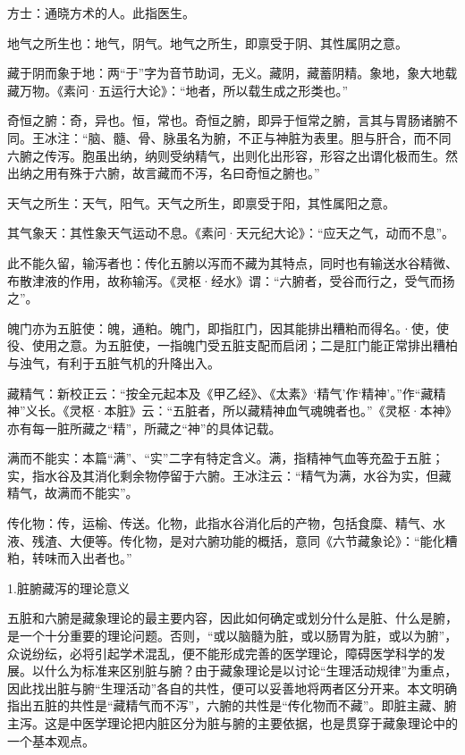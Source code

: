 \documentclass[12pt]{ctexbook}
\begin{document}

\begin{jiaozhu}
  \item 方士：通晓方术的人。此指医生。
  \item 地气之所生也：地气，阴气。地气之所生，即禀受于阴、其性属阴之意。
  \item 藏于阴而象于地：两“于”字为音节助词，无义。藏阴，藏蓄阴精。象地，象大地载藏万物。《素问·五运行大论》：“地者，所以载生成之形类也。”
  \item 奇恒之腑：奇，异也。恒，常也。奇恒之腑，即异于恒常之腑，言其与胃肠诸腑不同。王冰注：“脑、髓、骨、脉虽名为腑，不正与神脏为表里。胆与肝合，而不同六腑之传泻。胞虽出纳，纳则受纳精气，出则化出形容，形容之出谓化极而生。然出纳之用有殊于六腑，故言藏而不泻，名曰奇恒之腑也。”
  \item 天气之所生：天气，阳气。天气之所生，即禀受于阳，其性属阳之意。
  \item 其气象天：其性象天气运动不息。《素问·天元纪大论》：“应天之气，动而不息”。
  \item 此不能久留，输泻者也：传化五腑以泻而不藏为其特点，同时也有输送水谷精微、布散津液的作用，故称输泻。《灵枢·经水》谓：“六腑者，受谷而行之，受气而扬之”。
  \item 魄门亦为五脏使：魄，通粕。魄门，即指肛门，因其能排出糟粕而得名。·使，使役、使用之意。为五脏使，一指魄门受五脏支配而启闭；二是肛门能正常排出糟柏与浊气，有利于五脏气机的升降出入。
  \item 藏精气：新校正云：“按全元起本及《甲乙经》、《太素》‘精气’作‘精神’。”作“藏精神”义长。《灵枢·本脏》云：“五脏者，所以藏精神血气魂魄者也。”《灵枢·本神》亦有每一脏所藏之“精”，所藏之“神”的具体记载。
  \item 满而不能实：本篇“满”、“实”二字有特定含义。满，指精神气血等充盈于五脏；实，指水谷及其消化剩余物停留于六腑。王冰注云：“精气为满，水谷为实，但藏精气，故满而不能实”。
  \item 传化物：传，运榆、传送。化物，此指水谷消化后的产物，包括食糜、精气、水液、残渣、大便等。传化物，是对六腑功能的概括，意同《六节藏象论》：“能化糟粕，转味而入出者也。”
\end{jiaozhu}


1.脏腑藏泻的理论意义

五脏和六腑是藏象理论的最主要内容，因此如何确定或划分什么是脏、什么是腑，是一个十分重要的理论问题。否则，“或以脑髓为脏，或以肠胃为脏，或以为腑”，众说纷纭，必将引起学术混乱，便不能形成完善的医学理论，障碍医学科学的发展。以什么为标准来区别脏与腑？由于藏象理论是以讨论“生理活动规律”为重点，因此找出脏与腑“生理活动”各自的共性，便可以妥善地将两者区分开来。本文明确指出五脏的共性是“藏精气而不泻”，六腑的共性是“传化物而不藏”。即脏主藏、腑主泻。这是中医学理论把内脏区分为脏与腑的主要依据，也是贯穿于藏象理论中的一个基本观点。
\end{document}
